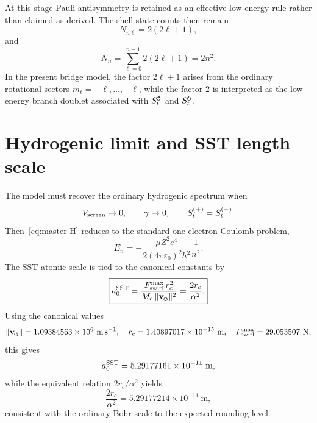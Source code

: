 \documentclass[11pt,a4paper]{article}
\newcommand{\swirlarrow}{\mathchoice{\mkern-2mu\scriptstyle\boldsymbol{\circlearrowleft}}{\mkern-2mu\scriptstyle\boldsymbol{\circlearrowleft}}{\mkern-2mu\scriptscriptstyle\boldsymbol{\circlearrowleft}}{\mkern-2mu\scriptscriptstyle\boldsymbol{\circlearrowleft}}}
\newcommand{\swirlarrowcw}{\mathchoice{\mkern-2mu\scriptstyle\boldsymbol{\circlearrowright}}{\mkern-2mu\scriptstyle\boldsymbol{\circlearrowright}}{\mkern-2mu\scriptscriptstyle\boldsymbol{\circlearrowright}}{\mkern-2mu\scriptscriptstyle\boldsymbol{\circlearrowright}}}
\newcommand{\vswirl}{\mathbf{v}_{\swirlarrow}}
\newcommand{\SwirlClock}{S_t^{\swirlarrow}}
\newcommand{\SwirlClockcw}{S_t^{\swirlarrowcw}}
\newcommand{\rc}{r_c}
\begin{document}
At this stage Pauli antisymmetry is retained as an effective low-energy rule rather than claimed as derived. The shell-state counts then remain
\begin{equation}
\label{eq:subshell-count}
N_{n\ell}=2(2\ell+1),
\end{equation}
and
\begin{equation}
\label{eq:shell-count}
N_n=\sum_{\ell=0}^{n-1}2(2\ell+1)=2n^2.
\end{equation}
In the present bridge model, the factor $2\ell+1$ arises from the ordinary rotational sectors $m_\ell=-\ell,\ldots,+\ell$, while the factor $2$ is interpreted as the low-energy branch doublet associated with $\SwirlClock$ and $\SwirlClockcw$.

\section{Hydrogenic limit and SST length scale}
The model must recover the ordinary hydrogenic spectrum when
\begin{equation}
V_{\rm screen}\to 0,
\qquad
\gamma\to 0,
\qquad
S_t^{(+)}=S_t^{(-)}.
\end{equation}
Then~\eqref{eq:master-H} reduces to the standard one-electron Coulomb problem,
\begin{equation}
\label{eq:En}
E_n=-\frac{\mu Z^2 e^4}{2(4\pi\varepsilon_0)^2\hbar^2}\frac{1}{n^2}.
\end{equation}
The SST atomic scale is tied to the canonical constants by
\begin{equation}
\label{eq:a0-sst}
\boxed{
a_0^{\rm SST}
=
\frac{F_{\rm swirl}^{\max}\,\rc^2}{M_e\,\lVert\vswirl\rVert^2}
=
\frac{2\rc}{\alpha^2}.
}
\end{equation}
Using the canonical values
\begin{equation}
\lVert\vswirl\rVert = 1.09384563\times 10^6\ \mathrm{m\,s^{-1}},
\quad
\rc = 1.40897017\times 10^{-15}\ \mathrm{m},
\quad
F_{\rm swirl}^{\max}=29.053507\ \mathrm{N},
\end{equation}
this gives
\begin{equation}
\label{eq:a0-num}
a_0^{\rm SST}
=
5.29177161\times 10^{-11}\ \mathrm{m},
\end{equation}
while the equivalent relation $2\rc/\alpha^2$ yields
\begin{equation}
\label{eq:a0-num2}
\frac{2\rc}{\alpha^2}=5.29177214\times 10^{-11}\ \mathrm{m},
\end{equation}
consistent with the ordinary Bohr scale to the expected rounding level.
\end{document}
